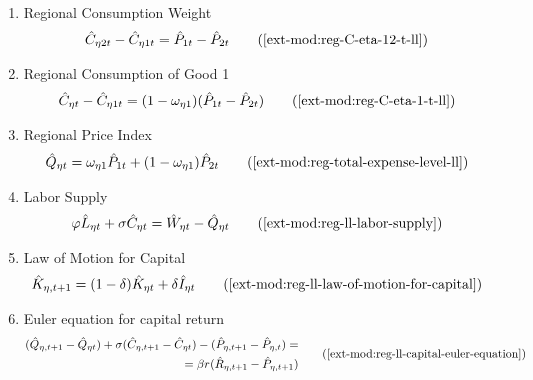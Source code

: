 \documentclass[../thesis.tex]{subfiles}
\begin{document}
{\begin{itemize}
\begin{enumerate}
			\item Regional Consumption Weight
			\begin{align}
				\hat{C}_{\eta 2t} - \hat{C}_{\eta 1t} &= \hat{P}_{1t} - \hat{P}_{2t} \tag{\ref{ext-mod:reg-C-eta-12-t-ll}}
			\end{align}
			
			\item Regional Consumption of Good 1
			\begin{align}
				\hat{C}_{\eta t} - \hat{C}_{\eta 1 t} &= (1 - \omega_{\eta 1}) (\hat{P}_{1t} - \hat{P}_{2t}) \tag{\ref{ext-mod:reg-C-eta-1-t-ll}}
			\end{align}
			
			\item Regional Price Index
			\begin{align}
				\hat{Q}_{\eta t} &= \omega_{\eta 1} \hat{P}_{1 t} + (1 -\omega_{\eta 1}) \hat{P}_{2 t} \tag{\ref{ext-mod:reg-total-expense-level-ll}}
			\end{align}
			
			\item Labor Supply
			\begin{alignat}{2}
				\varphi \hat{L}_{\eta t} + \sigma \hat{C}_{\eta t} &= \hat{W}_{\eta t} - \hat{Q}_{\eta t} \tag{\ref{ext-mod:reg-ll-labor-supply}}
			\end{alignat}
			
			\item Law of Motion for Capital
			\begin{align}
				\hat{K}_{\eta, t+1} &= (1-\delta) \hat{K}_{\eta t} + \delta \hat{I}_{\eta t} \tag{\ref{ext-mod:reg-ll-law-of-motion-for-capital}}
			\end{align}
			
			\item Euler equation for capital return
			\begin{align}
				\begin{split}
					(\hat{Q}_{\eta, t+1} - \hat{Q}_{\eta t}) + \sigma(\hat{C}_{\eta, t+1} - \hat{C}_{\eta t}) - (\hat{P}_{\eta, t+1} - \hat{P}_{\eta, t}) = \\
					\qquad = \beta r_{}(\hat{R}_{\eta, t+1} - \hat{P}_{\eta, t+1})
				\end{split} \tag{\ref{ext-mod:reg-ll-capital-euler-equation}}
			\end{align}
			
			
			\begin{comment}
				\item Region 1 Euler equation for the bonds return
				\begin{align}
					\hat{Q}_{1, t+1} - \hat{Q}_{1t} + \sigma (\hat{C}_{1, t+1} - \hat{C}_{1t}) &= (1 - \beta) \hat{R}_{t} \tag{\ref{ext-mod:reg-bonds-euler-equation-ll}}
				\end{align}
				

\end{comment}
\end{enumerate}
\end{itemize}}
\end{document}
